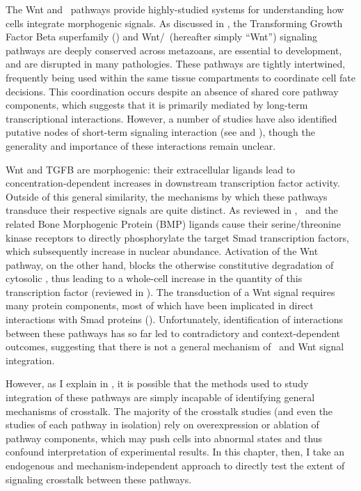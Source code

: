 The Wnt and \tgfbsf\ pathways provide highly-studied
systems for understanding how cells integrate
morphogenic signals.
As discussed in , the 
Transforming Growth Factor Beta superfamily (\tgfbsf) and
Wnt/\bcat\ (hereafter simply ``Wnt'') signaling
pathways are deeply conserved across metazoans,
are essential to development, and are disrupted
in many pathologies. These pathways are tightly
intertwined, frequently being used within the same
tissue compartments to coordinate cell fate decisions.
This coordination occurs despite an absence of shared core
pathway components, which suggests that it is primarily
mediated by long-term transcriptional interactions.
However, a number of studies have also identified
putative nodes of short-term signaling interaction
(see  and
),
though the generality and importance of these
interactions remain unclear.


Wnt and TGFB are morphogenic:
their extracellular ligands lead to concentration-dependent
increases in downstream transcription factor activity.
Outside of this general similarity, the mechanisms by
which these pathways transduce their respective signals
are quite distinct. As reviewed in
, \tgf\ and the related Bone Morphogenic
Protein (BMP) ligands cause their serine/threonine kinase
receptors to directly phosphorylate the target Smad
transcription factors, which subsequently increase in
nuclear abundance. Activation of the Wnt
pathway, on the other hand, blocks the otherwise
constitutive degradation of cytosolic \bcat,
thus leading to a whole-cell increase in the quantity
of this transcription factor
(reviewed in ). The transduction of a
Wnt signal requires many protein components,
most of which have been implicated in direct
interactions with Smad proteins ().
Unfortunately, identification of interactions between
these pathways has so far led to contradictory and
context-dependent outcomes, suggesting that there is not
a general mechanism of \tgfbsf\ and Wnt signal integration.


However, as I explain in ,
it is possible that the methods used to study integration
of these pathways are simply incapable of identifying general
mechanisms of crosstalk. The majority of the crosstalk
studies (and even the studies of each pathway in isolation)
rely on overexpression or ablation of pathway components,
which may push cells into abnormal states and thus confound
interpretation of experimental results.
In this chapter, then, I take an endogenous and mechanism-independent
approach to directly test the extent
of signaling crosstalk between these pathways.


